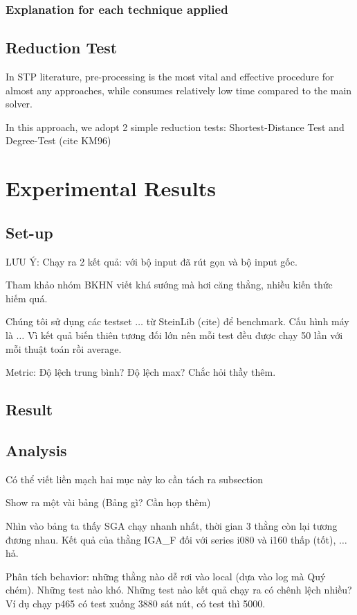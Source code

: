 \documentclass[runningheads]{llncs}
\begin{document}
\subsubsection*{Explanation for each technique applied}

\subsection{Reduction Test}
In STP literature, pre-processing is the most vital and effective procedure for almost any approaches, 
while consumes relatively low time compared to the main solver.

In this approach, we adopt 2 simple reduction tests: Shortest-Distance Test and Degree-Test (cite KM96)

\section{Experimental Results} \label{experiment}
\subsection{Set-up}
LƯU Ý: Chạy ra 2 kết quả: với bộ input đã rút gọn và bộ input gốc.

Tham khảo nhóm BKHN viết khá sướng mà hơi căng thẳng, nhiều kiến thức hiếm quá.

Chúng tôi sử dụng các testset $\dots$ từ SteinLib (cite) để benchmark. Cấu hình máy là $\dots$ Vì kết quả biến thiên tương đối lớn 
nên mỗi test đều được chạy 50 lần với mỗi thuật toán rồi average.

Metric: Độ lệch trung bình? Độ lệch max? Chắc hỏi thầy thêm.

\subsection{Result}
\subsection{Analysis}
Có thể viết liền mạch hai mục này ko cần tách ra subsection

Show ra một vài bảng (Bảng gì? Cần họp thêm)

Nhìn vào bảng ta thấy SGA chạy nhanh nhất, thời gian 3 thằng còn lại tương đương nhau.
Kết quả của thằng IGA\_F đối với series i080 và i160 thấp (tốt), $\dots$ hả.

Phân tích behavior: những thằng nào dễ rơi vào local (dựa vào log mà Quý chém). Những test nào khó. Những test nào kết quả chạy ra
có chênh lệch nhiều? Ví dụ chạy p465 có test xuống 3880 sát nút, có test thì 5000. 
\end{document}
